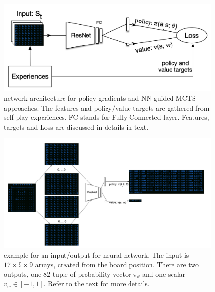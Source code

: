 \documentclass{article}
\begin{document}
\begin{figure}
\centering
\includegraphics[width=0.8\linewidth]{nn}
\caption{network architecture for policy gradients and NN guided MCTS approaches. The features and policy/value targets are gathered from self-play experiences. FC stands for Fully Connected layer. Features, targets and Loss are discussed in details in text.}
\label{fig:nn}
\end{figure}

\begin{figure}
\centering
\includegraphics[width=1.0\linewidth]{inference}
\caption{example for an input/output for neural network. The input is $17 \times 9 \times 9 $ arrays, created from the board position. There are two outputs, one $82$-tuple of probability vector $\pi_{\theta}$ and one scalar $v_w \in [-1, 1]$. Refer to the text for more details. }
\label{fig:inference}
\end{figure}
\end{document}
